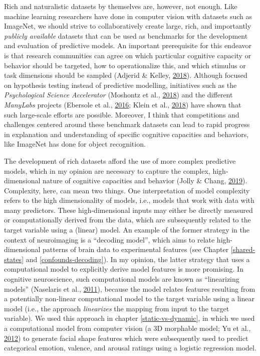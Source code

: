 \documentclass[12pt,american,a4paper,oneside,]{memoir} %
\begin{document}
Rich and naturalistic datasets by themselves are, however, not enough. Like machine learning researchers have done in computer vision with datasets such as ImageNet, we should strive to collaboratively create large, rich, and importantly \emph{publicly available} datasets that can be used as benchmarks for the development and evaluation of predictive models. An important prerequisite for this endeavor is that research communities can agree on which particular cognitive capacity or behavior should be targeted, how to operationalize this, and which stimulus or task dimensions should be sampled (Adjerid \& Kelley, \protect\hyperlink{ref-Adjerid2018-vs}{2018}). Although focused on hypothesis testing instead of predictive modelling, initiatives such as the \emph{Psychological Science Accelerator} (Moshontz et al., \protect\hyperlink{ref-Moshontz2018-rc}{2018}) and the different \emph{ManyLabs} projects (Ebersole et al., \protect\hyperlink{ref-Ebersole2016-cr}{2016}; Klein et al., \protect\hyperlink{ref-Klein2018-un}{2018}) have shown that such large-scale efforts are possible. Moreover, I think that competitions and challenges centered around these benchmark datasets can lead to rapid progress in explanation and understanding of specific cognitive capacities and behaviors, like ImageNet has done for object recognition.

The development of rich datasets afford the use of more complex predictive models, which in my opinion are necessary to capture the complex, high-dimensional nature of cognitive capacities and behavior (Jolly \& Chang, \protect\hyperlink{ref-Jolly2019-lx}{2019}). Complexity, here, can mean two things. One interpretation of model complexity refers to the high dimensionality of models, i.e., models that work with data with many predictors. These high-dimensional inputs may either be directly measured or computationally derived from the data, which are subsequently related to the target variable using a (linear) model. An example of the former strategy in the context of neuroimaging is a ``decoding model'', which aims to relate high-dimensional patterns of brain data to experimental features (see Chapter \ref{shared-states} and \ref{confounds-decoding}). In my opinion, the latter strategy that uses a computational model to explicitly derive model features is more promising. In cognitive neuroscience, such computational models are known as ``linearizing models'' (Naselaris et al., \protect\hyperlink{ref-Naselaris2011-oh}{2011}), because the model relates features resulting from a potentially non-linear computational model to the target variable using a linear model (i.e., the approach \emph{linearizes} the mapping from input to the target variable). We used this approach in chapter \ref{static-vs-dynamic}, in which we used a computational model from computer vision (a 3D morphable model; Yu et al., \protect\hyperlink{ref-Yu2012-ag}{2012}) to generate facial shape features which were subsequently used to predict categorical emotion, valence, and arousal ratings using a logistic regression model.
\end{document}
